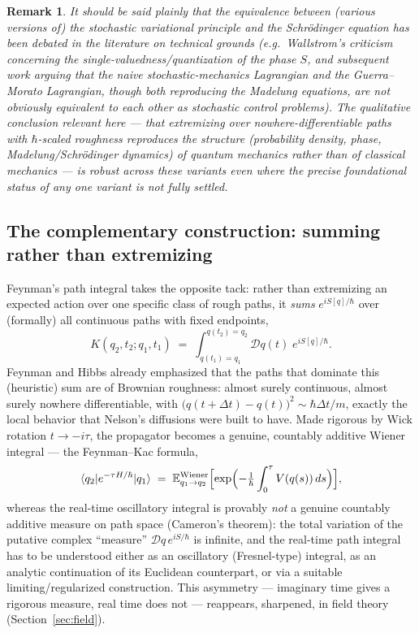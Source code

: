 \documentclass[11pt]{article}
\newtheorem{remark}[theorem]{Remark}
\newcommand{\D}{\mathcal{D}}
\begin{document}
\begin{remark}
It should be said plainly that the equivalence between (various versions of) the stochastic variational principle and the Schr\"odinger equation has been debated in the literature on technical grounds (e.g.\ Wallstrom's criticism concerning the single-valuedness/quantization of the phase $S$, and subsequent work arguing that the naive stochastic-mechanics Lagrangian and the Guerra--Morato Lagrangian, though both reproducing the Madelung equations, are not obviously equivalent to each other as stochastic control problems). The qualitative conclusion relevant here --- that extremizing over nowhere-differentiable paths with $\hbar$-scaled roughness reproduces the structure (probability density, phase, Madelung/Schr\"odinger dynamics) of quantum mechanics rather than of classical mechanics --- is robust across these variants even where the precise foundational status of any one variant is not fully settled.
\end{remark}

\subsection{The complementary construction: summing rather than extremizing}

Feynman's path integral takes the opposite tack: rather than extremizing an expected action over one specific class of rough paths, it \emph{sums} $e^{iS[q]/\hbar}$ over (formally) all continuous paths with fixed endpoints,
\[
K(q_2,t_2;q_1,t_1) \;=\; \int_{q(t_1)=q_1}^{q(t_2)=q_2} \D q(t)\; e^{iS[q]/\hbar}.
\]
Feynman and Hibbs already emphasized that the paths that dominate this (heuristic) sum are of Brownian roughness: almost surely continuous, almost surely nowhere differentiable, with $\bigl(q(t+\Delta t)-q(t)\bigr)^2 \sim \hbar\Delta t/m$, exactly the local behavior that Nelson's diffusions were built to have. Made rigorous by Wick rotation $t\to -i\tau$, the propagator becomes a genuine, countably additive Wiener integral --- the Feynman--Kac formula,
\[
\langle q_2 | e^{-\tau H/\hbar} | q_1\rangle \;=\; \mathbb{E}^{\text{Wiener}}_{q_1\to q_2}\Bigl[\exp\Bigl(-\tfrac1\hbar\int_0^\tau V(q(s))\,ds\Bigr)\Bigr],
\]
whereas the real-time oscillatory integral is provably \emph{not} a genuine countably additive measure on path space (Cameron's theorem): the total variation of the putative complex ``measure'' $\D q\, e^{iS/\hbar}$ is infinite, and the real-time path integral has to be understood either as an oscillatory (Fresnel-type) integral, as an analytic continuation of its Euclidean counterpart, or via a suitable limiting/regularized construction. This asymmetry --- imaginary time gives a rigorous measure, real time does not --- reappears, sharpened, in field theory (Section~\ref{sec:field}).
\end{document}

